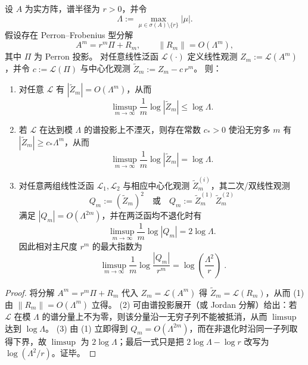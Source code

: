 

\begin{proposition}[中心化二次观测的极大相对指数]\label{prop:pom-deltaq-quadratic-observable-max-exponent}
设 \(A\) 为实方阵，谱半径为 \(r>0\)，并令
\[
\Lambda:=\max_{\mu\in\sigma(A)\setminus\{r\}}|\mu|.
\]
假设存在 Perron--Frobenius 型分解
\[
A^m=r^m\Pi+R_m,\qquad \|R_m\|=O(\Lambda^m),
\]
其中 \(\Pi\) 为 Perron 投影。
对任意线性泛函 \(\mathcal L(\cdot)\) 定义线性观测 \(Z_m:=\mathcal L(A^m)\)，并令 \(c:=\mathcal L(\Pi)\) 与中心化观测 \(\widetilde Z_m:=Z_m-c\,r^m\)。
则：
\begin{enumerate}
  \item 对任意 \(\mathcal L\) 有 \(|\widetilde Z_m|=O(\Lambda^m)\)，从而
  \[
  \limsup_{m\to\infty}\frac{1}{m}\log|\widetilde Z_m|\le \log\Lambda.
  \]
  \item 若 \(\mathcal L\) 在达到模 \(\Lambda\) 的谱投影上不湮灭，则存在常数 \(c_\ast>0\) 使沿无穷多 \(m\) 有 \(|\widetilde Z_m|\ge c_\ast \Lambda^m\)，从而
  \[
  \limsup_{m\to\infty}\frac{1}{m}\log|\widetilde Z_m|=\log\Lambda.
  \]
  \item 对任意两组线性泛函 \(\mathcal L_1,\mathcal L_2\) 与相应中心化观测 \(\widetilde Z^{(i)}_m\)，其二次/双线性观测
  \[
  Q_m:=(\widetilde Z_m)^2\quad\text{或}\quad Q_m:=\widetilde Z^{(1)}_m\,\widetilde Z^{(2)}_m
  \]
  满足 \(|Q_m|=O(\Lambda^{2m})\)，并在两泛函均不退化时有
  \[
  \limsup_{m\to\infty}\frac{1}{m}\log|Q_m|=2\log\Lambda.
  \]
  因此相对主尺度 \(r^m\) 的最大指数为
  \[
  \boxed{\;
  \limsup_{m\to\infty}\frac{1}{m}\log\frac{|Q_m|}{r^m}
  =\log\!\left(\frac{\Lambda^2}{r}\right)\; }.
  \]
\end{enumerate}
\end{proposition}
\begin{proof}
将分解 \(A^m=r^m\Pi+R_m\) 代入 \(Z_m=\mathcal L(A^m)\) 得
\(
\widetilde Z_m=\mathcal L(R_m)
\)，从而 (1) 由 \(\|R_m\|=O(\Lambda^m)\) 立得。
(2) 可由谱投影展开（或 Jordan 分解）给出：若 \(\mathcal L\) 在模 \(\Lambda\) 的谱分量上不为零，则该分量沿一无穷子列不能被抵消，从而 \(\limsup\) 达到 \(\log\Lambda\)。
(3) 由 (1) 立即得到 \(Q_m=O(\Lambda^{2m})\)，而在非退化时沿同一子列取得下界，故 \(\limsup\) 为 \(2\log\Lambda\)；最后一式只是把 \(2\log\Lambda-\log r\) 改写为 \(\log(\Lambda^2/r)\)。证毕。
\end{proof}

